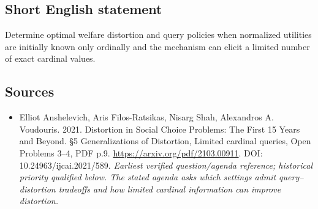 \documentclass[11pt]{article}
\begin{document}
\subsection{Short English statement}
Determine optimal welfare distortion and query policies when normalized utilities are initially known only ordinally and the mechanism can elicit a limited number of exact cardinal values.

\subsection{Sources}
\begin{itemize}\raggedright
\item[\textnormal{[S1]}]\hypertarget{source:30007561:1}{} Elliot Anshelevich, Aris Filos-Ratsikas, Nisarg Shah, Alexandros A. Voudouris. 2021. Distortion in Social Choice Problems: The First 15 Years and Beyond. §5 Generalizations of Distortion, Limited cardinal queries, Open Problems 3–4, PDF p.9.
\url{https://arxiv.org/pdf/2103.00911}.
DOI: 10.24963/ijcai.2021/589.
{\small\textit{Earliest verified question/agenda reference; historical priority qualified below. The stated agenda asks which settings admit query–distortion tradeoffs and how limited cardinal information can improve distortion.}}
\end{itemize}
\end{document}
